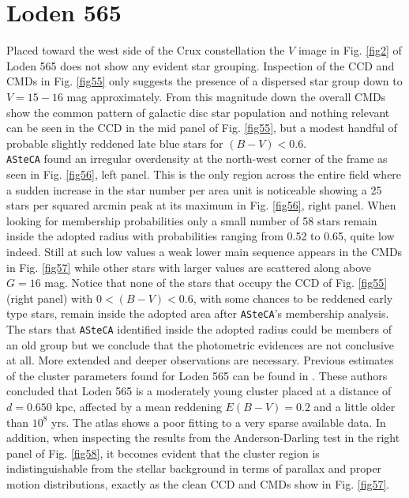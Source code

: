 \documentclass[draft]{aa}
\begin{document}
\section{Loden 565}

Placed toward the west side of the Crux constellation the $V$ image in Fig. 
\ref{fig2} of Loden 565 does not show any evident star grouping. Inspection of
the CCD and CMDs in Fig. \ref{fig55} only suggests the presence of a dispersed
star group down to $V= 15-16$ mag approximately. From this magnitude down the
overall CMDs show the common pattern of galactic disc star population and
nothing relevant can be seen in the CCD in the mid panel of Fig. \ref{fig55}, but
a modest handful of probable slightly reddened late blue stars for
$(B-V)<0.6$.\\

\texttt{ASteCA} found an irregular overdensity at the north-west corner of the
frame as seen in Fig. \ref{fig56}, left panel. This is the only region across the
entire field where a sudden increase in the star number per area unit is
noticeable showing a 25 stars per squared arcmin peak at its maximum in Fig. 
\ref{fig56}, right panel.
%
When looking for membership probabilities only a small number of 58 stars
remain inside the adopted radius with probabilities ranging from 0.52 to 0.65,
quite low indeed. Still at such low values a weak lower main sequence appears
in the CMDs in Fig. \ref{fig57} while other stars with larger values are
scattered along above $G=16$ mag. Notice that none of the stars that
occupy the CCD of Fig. \ref{fig55} (right panel) with $0<(B-V)<0.6$, with some
chances to be reddened early type stars, remain inside the adopted area after 
\texttt{ASteCA}'s membership analysis. The stars that \texttt{ASteCA}
identified inside the adopted radius could be members of an old group but we
conclude that the photometric evidences are not conclusive at all. More extended
and deeper observations are necessary. Previous estimates of the cluster
parameters found for Loden 565 can be found in \cite{Kharchenko_2005}.
These authors concluded that Loden 565 is a moderately young cluster placed at a
distance of $d = 0.650$ kpc, affected by a mean reddening $E(B-V)= 0.2$ and
a little older than $10^8$ yrs. The \cite{Kharchenko_2005} atlas shows a
poor fitting to a very sparse available data. In addition, when inspecting the
results from the Anderson-Darling test in the right panel of Fig. \ref{fig58},
it becomes evident that the cluster region is indistinguishable from the
stellar background in terms of parallax and proper motion distributions,
exactly as the clean CCD and CMDs show in Fig. \ref{fig57}.\\
\end{document}
